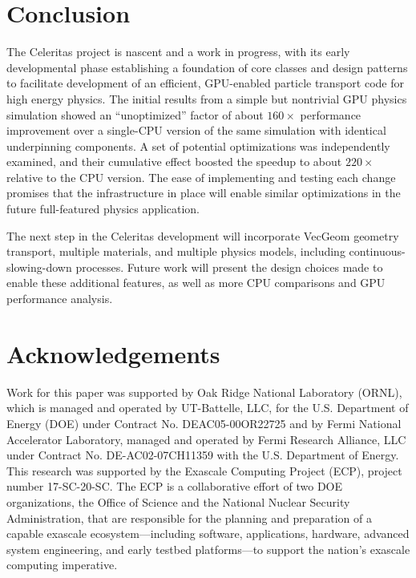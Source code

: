 \documentclass{webofc}
\begin{document}
\section{Conclusion}

The Celeritas project is nascent and a work in progress, with its
early developmental phase establishing a foundation of core classes and
design patterns to facilitate development of an efficient, GPU-enabled particle
transport code for high energy physics. The initial results from a simple but
nontrivial GPU physics simulation showed an ``unoptimized'' factor of about
$160\times$ performance improvement over a single-CPU version of the same
simulation with identical underpinning components. A set of potential
optimizations was independently examined, and their cumulative effect boosted
the speedup to about $220\times$ relative to the CPU version. The ease of
implementing and testing each change promises that the infrastructure in place
will enable similar optimizations in the future full-featured physics
application.

The next step in the Celeritas development will incorporate VecGeom geometry
transport, multiple materials, and multiple physics models, including
continuous-slowing-down processes. Future work will present the design choices
made to enable these additional features, as well as more CPU comparisons and
GPU performance analysis.

\section{Acknowledgements}

Work for this paper was supported by Oak Ridge National Laboratory (ORNL), which is managed and operated by UT-Battelle, LLC, for the U.S. Department of Energy (DOE) under Contract No. DEAC05-00OR22725 and by Fermi National Accelerator Laboratory, managed and operated by Fermi Research Alliance, LLC under Contract No. DE-AC02-07CH11359 with the U.S. Department of Energy.
This research was supported by the Exascale Computing
Project (ECP), project number 17-SC-20-SC. The ECP is a collaborative effort of
two DOE organizations, the Office of Science and the National Nuclear Security
Administration, that are responsible for the planning and preparation of a
capable exascale ecosystem---including software, applications, hardware,
advanced system engineering, and early testbed platforms---to support the
nation's exascale computing imperative.


\end{document}
